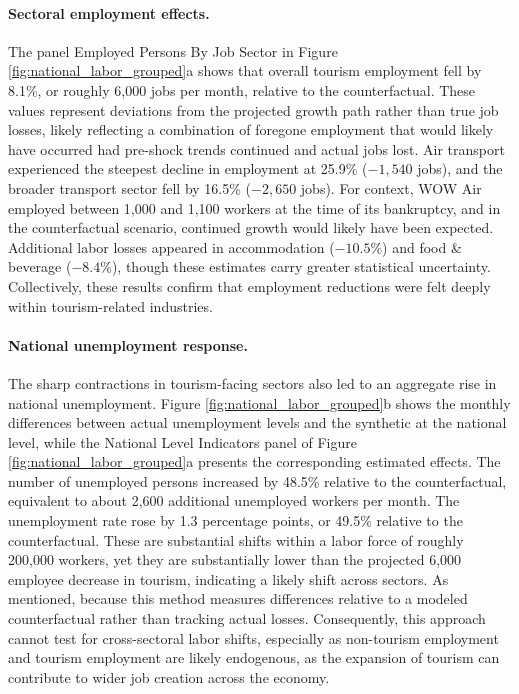 \documentclass[12pt]{article}
\begin{document}
\paragraph{Sectoral employment effects.}
The panel Employed Persons By Job Sector in Figure \ref{fig:national_labor_grouped}a shows that overall tourism employment fell by 8.1\%, or roughly 6,000 jobs per month, relative to the counterfactual. These values represent deviations from the projected growth path rather than true job losses, likely reflecting a combination of foregone employment that would likely have occurred had pre-shock trends continued and actual jobs lost. Air transport experienced the steepest decline in employment at 25.9\% ($-1,540$ jobs), and the broader transport sector fell by 16.5\% ($-2,650$ jobs). For context, WOW Air employed between 1,000 and 1,100 workers at the time of its bankruptcy, and in the counterfactual scenario, continued growth would likely have been expected. Additional labor losses appeared in accommodation ($-10.5\%$) and food \& beverage ($-8.4\%$), though these estimates carry greater statistical uncertainty. Collectively, these results confirm that employment reductions were felt deeply within tourism-related industries.

\paragraph{National unemployment response.}
The sharp contractions in tourism-facing sectors also led to an aggregate rise in national unemployment. Figure \ref{fig:national_labor_grouped}b shows the monthly differences between actual unemployment levels and the synthetic at the national level, while the National Level Indicators panel of Figure \ref{fig:national_labor_grouped}a presents the corresponding estimated effects. The number of unemployed persons increased by 48.5\% relative to the counterfactual, equivalent to about 2,600 additional unemployed workers per month. The unemployment rate rose by 1.3 percentage points, or 49.5\% relative to the counterfactual. These are substantial shifts within a labor force of roughly 200,000 workers, yet they are substantially lower than the projected 6,000 employee decrease in tourism, indicating a likely shift across sectors. As mentioned, because this method measures differences relative to a modeled counterfactual rather than tracking actual losses. Consequently, this approach cannot test for cross-sectoral labor shifts, especially as non-tourism employment and tourism employment are likely endogenous, as the expansion of tourism can contribute to wider job creation across the economy.
\end{document}
